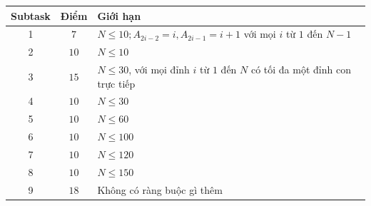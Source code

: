 \begin{center}
  \begin{tabular}{|c|c|l|} \hline
    \textbf{Subtask} & \textbf{Điểm} & \textbf{Giới hạn} \\ \hline
    1 & $7$ & $N\le 10; A_{2i-2}=i,A_{2i-1}=i+1$ với mọi $i$ từ $1$ đến $N-1$ \\ \hline
    2 & $10$ & $N\le 10$ \\ \hline
    3 & $15$ & $N\le 30$, với mọi đỉnh $i$ từ $1$ đến $N$ có tối đa một đỉnh con trực tiếp \\ \hline
    4 & $10$ & $N\le 30$ \\ \hline
    5 & $10$ & $N\le 60$ \\ \hline
    6 & $10$ & $N\le 100$ \\ \hline
    7 & $10$ & $N\le 120$ \\ \hline
    8 & $10$ & $N\le 150$ \\ \hline
    9 & $18$ & Không có ràng buộc gì thêm \\ \hline
  \end{tabular}
\end{center}